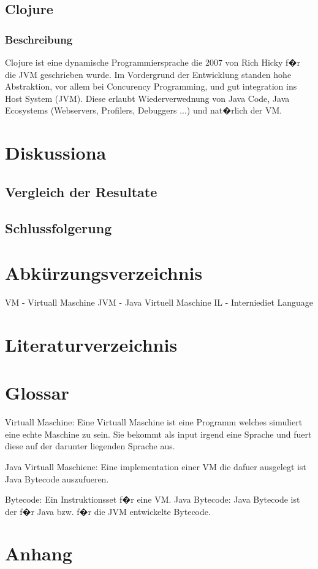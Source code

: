 \documentclass{fancydocument}
\begin{document}
\subsection{Clojure}

\subsubsection{Beschreibung}

Clojure ist eine dynamische Programmiersprache die 2007 von Rich Hicky
f�r die JVM geschrieben wurde. Im Vordergrund der Entwicklung standen
hohe Abstraktion, vor allem bei Concurency Programming, und gut
integration ins Host System (JVM). Diese erlaubt Wiederverwednung von
Java Code, Java Ecosystems (Webservers, Profilers, Debuggers
...) und nat�rlich der VM.



\section{Diskussiona}
\subsection{Vergleich der Resultate}
\subsection{Schlussfolgerung}
\section{Abk\"urzungsverzeichnis}

VM  - Virtuall Maschine
JVM - Java Virtuell Maschine
IL - Interniediet Language

\section{Literaturverzeichnis}



\section{Glossar}

Virtuall Maschine: Eine Virtuall Maschine ist eine Programm welches simuliert eine echte
Maschine zu sein. Sie bekommt als input irgend eine Sprache und fuert
diese auf der darunter liegenden Sprache aus.

Java Virtuall Maschiene: Eine implementation einer VM die dafuer ausgelegt ist Java Bytecode auszufueren.

Bytecode: Ein Instruktionsset f�r eine VM.
Java Bytecode: Java Bytecode ist der f�r Java bzw. f�r die JVM
entwickelte Bytecode.


\section{Anhang}
\end{document}
